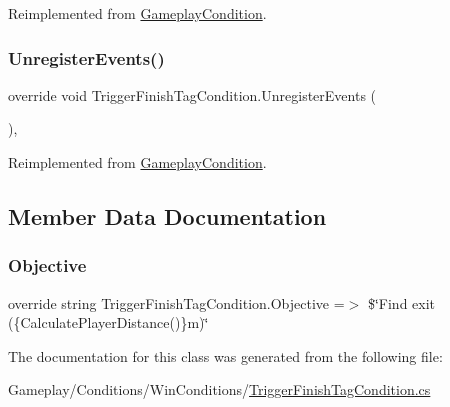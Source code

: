 Reimplemented from \mbox{\hyperlink{class_gameplay_condition_ae40b690b7dbe3977bcd4429b7bf95afb}{Gameplay\+Condition}}.

\mbox{\label{class_trigger_finish_tag_condition_a53d94c37b0464e8c450bbc4800ff62d5}} 
\subsubsection{\texorpdfstring{Unregister\+Events()}{UnregisterEvents()}}
{\footnotesize\ttfamily override void Trigger\+Finish\+Tag\+Condition.\+Unregister\+Events (\begin{DoxyParamCaption}{ }\end{DoxyParamCaption})\hspace{0.3cm}{\ttfamily [protected]}, {\ttfamily [virtual]}}



Reimplemented from \mbox{\hyperlink{class_gameplay_condition_a70bf44c9b6395036a59c58611578cac6}{Gameplay\+Condition}}.



\subsection{Member Data Documentation}
\mbox{\label{class_trigger_finish_tag_condition_ac5fc9659ba847adf7f1860bd3ea056f3}} 
\subsubsection{\texorpdfstring{Objective}{Objective}}
{\footnotesize\ttfamily override string Trigger\+Finish\+Tag\+Condition.\+Objective =$>$ \$\char`\"{}Find exit (\{Calculate\+Player\+Distance()\}m)\char`\"{}}



The documentation for this class was generated from the following file\+:\begin{DoxyCompactItemize}
\item 
Gameplay/\+Conditions/\+Win\+Conditions/\mbox{\hyperlink{_trigger_finish_tag_condition_8cs}{Trigger\+Finish\+Tag\+Condition.\+cs}}\end{DoxyCompactItemize}
